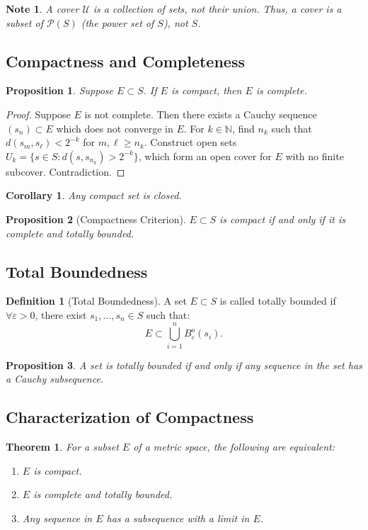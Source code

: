\documentclass[9pt]{article}
\theoremstyle{definition}
\newtheorem{definition}{Definition}
\theoremstyle{plain}
\newtheorem{theorem}{Theorem}
\newtheorem{proposition}{Proposition}
\newtheorem{corollary}{Corollary}
\newtheorem{note}{Note}
\begin{document}
\begin{note}
A cover \( \mathcal{U} \) is a collection of sets, not their union. Thus, a cover is a subset of \( \mathcal{P}(S) \) (the power set of \( S \)), not \( S \).
\end{note}

\subsection*{Compactness and Completeness}
\begin{proposition}
Suppose \( E \subset S \). If \( E \) is compact, then \( E \) is complete.
\end{proposition}

\begin{proof}
Suppose \( E \) is not complete. Then there exists a Cauchy sequence \( (s_n) \subset E \) which does not converge in \( E \). For \( k \in \mathbb{N} \), find \( n_k \) such that \( d(s_m, s_\ell) < 2^{-k} \) for \( m, \ell \geq n_k \). Construct open sets \( U_k = \{s \in S : d(s, s_{n_k}) > 2^{-k}\} \), which form an open cover for \( E \) with no finite subcover. Contradiction.
\end{proof}

\begin{corollary}
Any compact set is closed.
\end{corollary}

\begin{proposition}[Compactness Criterion]
\( E \subset S \) is compact if and only if it is complete and totally bounded.
\end{proposition}

\subsection*{Total Boundedness}
\begin{definition}[Total Boundedness]
A set \( E \subset S \) is called totally bounded if \( \forall \varepsilon > 0 \), there exist \( s_1, \ldots, s_n \in S \) such that:
\[
E \subset \bigcup_{i=1}^n B_\varepsilon^o(s_i).
\]
\end{definition}

\begin{proposition}
A set is totally bounded if and only if any sequence in the set has a Cauchy subsequence.
\end{proposition}

\subsection*{Characterization of Compactness}
\begin{theorem}
For a subset \( E \) of a metric space, the following are equivalent:
\begin{enumerate}
    \item \( E \) is compact.
    \item \( E \) is complete and totally bounded.
    \item Any sequence in \( E \) has a subsequence with a limit in \( E \).
\end{enumerate}
\end{theorem}
\end{document}
